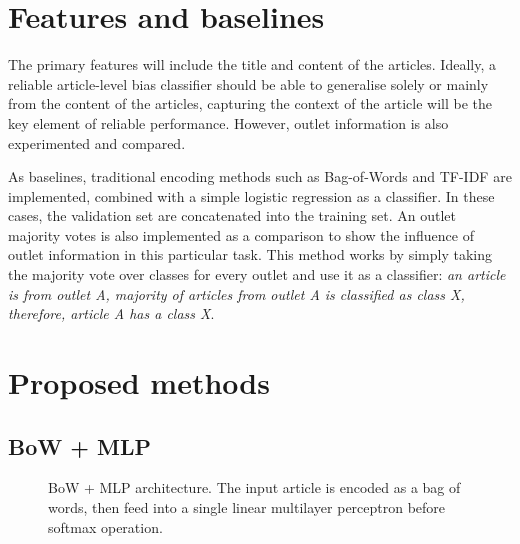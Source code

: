 \section{Features and baselines}

The primary features will include the title and content of the articles. Ideally, a reliable article-level bias classifier should be able to generalise solely or mainly from the content of the articles, capturing the context of the article will be the key element of reliable performance. However, outlet information is also experimented and compared.

As baselines, traditional encoding methods such as Bag-of-Words and TF-IDF are implemented, combined with a simple logistic regression as a classifier. In these cases, the validation set are concatenated into the training set. An outlet majority votes is also implemented as a comparison to show the influence of outlet information in this particular task. This method works by simply taking the majority vote over classes for every outlet and use it as a classifier: \textit{an article is from outlet A, majority of articles from outlet A is classified as class X, therefore, article A has a class X}.

\section{Proposed methods}

\subsection{BoW + MLP}

\begin{figure}[htbp]
    \centering
    \caption{BoW + MLP architecture. The input article is encoded as a bag of words, then feed into a single linear multilayer perceptron before softmax operation.}
    \label{fig:bow_mlp_architecture}
\end{figure}

